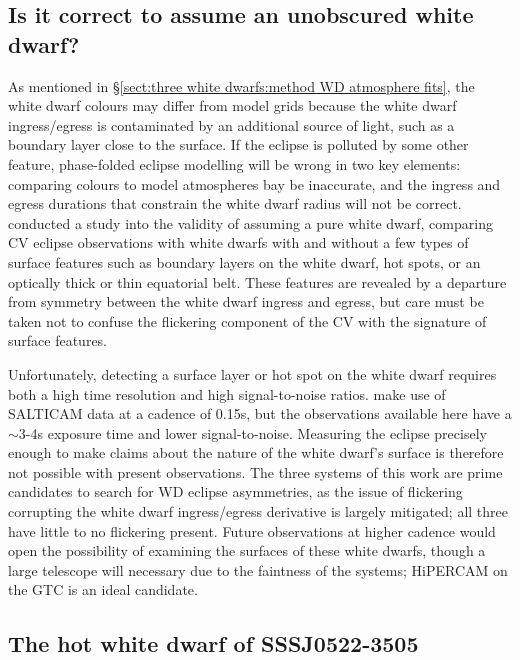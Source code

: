 \subsection{Is it correct to assume an unobscured white dwarf?}
\label{sect:impure white dwarf discussion}

As mentioned in \S\ref{sect:three white dwarfs:method WD atmosphere fits}, the white dwarf colours may differ from model grids because the white dwarf ingress/egress is contaminated by an additional source of light, such as a boundary layer close to the surface.
If the eclipse is polluted by some other feature, phase-folded eclipse modelling will be wrong in two key elements: comparing colours to model atmospheres bay be inaccurate, and the ingress and egress durations that constrain the white dwarf radius will not be correct.
\citet{Spark2015} conducted a study into the validity of assuming a pure white dwarf, comparing CV eclipse observations with white dwarfs with and without a few types of surface features such as boundary layers on the white dwarf, hot spots, or an optically thick or thin equatorial belt.
These features are revealed by a departure from symmetry between the white dwarf ingress and egress, but care must be taken not to confuse the flickering component of the CV with the signature of surface features.

Unfortunately, detecting a surface layer or hot spot on the white dwarf requires both a high time resolution and high signal-to-noise ratios. \citet{Spark2015} make use of SALTICAM data at a cadence of 0.15s, but the observations available here have a $\sim$3-4s exposure time and lower signal-to-noise. Measuring the eclipse precisely enough to make claims about the nature of the white dwarf's surface is therefore not possible with present observations.
The three systems of this work are prime candidates to search for WD eclipse asymmetries, as the issue of flickering corrupting the white dwarf ingress/egress derivative is largely mitigated; all three have little to no flickering present.
Future observations at higher cadence would open the possibility of examining the surfaces of these white dwarfs, though a large telescope will necessary due to the faintness of the systems; HiPERCAM on the GTC is an ideal candidate.


\subsection{The hot white dwarf of SSSJ0522-3505}
\label{sect:SSSJ0522-3505 white dwarf temperature discussion}

